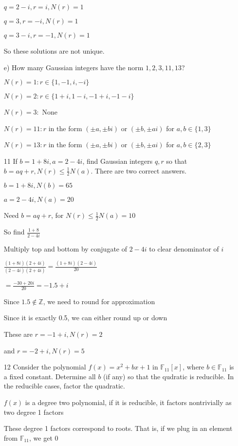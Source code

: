 \documentclass[12pt]{article}
\begin{document}
\begin{itemize}
		$q = 2 -i, r = i, N(r) = 1$
		
		$q = 3, r = -i, N(r) = 1$
		
		$q= 3- i, r = -1, N(r) = 1$
	
		So these solutions are not unique.

		e) How many Gaussian integers have the norm $1,2,3,11,13$?

		$N(r) = 1: r \in \{1, -1, i, -i\}$

		$N(r) = 2: r \in \{1+i, 1-i, -1+i, -1 - i\}$

		$N(r) = 3:$ None

		$N(r) = 11: r$ in the form $(\pm a, \pm b i)$ or $(\pm b, \pm a i)$ for $a,b \in \{1, 3\}$

		$N(r) = 13: r$ in the form $(\pm a, \pm b i)$ or $(\pm b, \pm a i)$ for $a,b \in \{2, 3\}$

	\item[11] If $b = 1 + 8i, a = 2-4i$, find Gaussian integers $q,r$ so that $b = aq + r, N(r) \leq \frac{1}{2} N(a)$. There are two correct answers.

		$b = 1 + 8i, N(b) = 65$

		$a = 2 - 4i, N(a) = 20$

		Need $b = aq + r$, for $N(r) \leq \frac{1}{2} N(a) = 10$

		So find $\frac{1+8}{2-4i}$

		Multiply top and bottom by conjugate of $2-4i$ to clear denominator of $i$

		$\frac{(1+8i)(2+4i)}{(2-4i)(2+4i)} = \frac{(1+8i)(2-4i)}{20}$

		$=\frac{-30+20i}{20} = -1.5 + i$

		Since $1.5 \not \in \mathbb{Z}$, we need to round for approximation

		Since it is exactly 0.5, we can either round up or down

		These are $r = -1 + i, N(r) = 2$

		and $r = -2 + i, N(r) = 5$

	\item[12] Consider the polynomial $f(x) = x^2 + bx + 1$ in $\mathbb{F}_{11}[x]$, where $b\in \mathbb{F}_{11}$ is a fixed constant. Determine all $b$ (if any) so that the qudratic is reducible. In the reducible cases, factor the quadratic.

		$f(x)$ is a degree two polynomial, if it is reducible, it factors nontrivially as two degree 1 factors

		These degree 1 factors correspond to roots. That is, if we plug in an element from $\mathbb{F}_{11}$, we get 0


\end{itemize}
\end{document}
